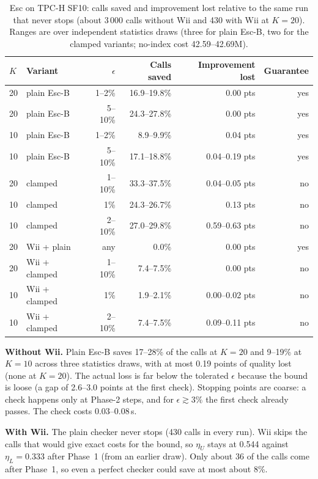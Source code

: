 \begin{table}[h]\centering\small
\begin{tabular}{llrrrr}\toprule
$K$ & Variant & $\epsilon$ & Calls saved & Improvement lost & Guarantee\\\midrule
20 & plain Esc-B & 1--2\% & 16.9--19.8\% & 0.00 pts & yes\\
20 & plain Esc-B & 5--10\% & 24.3--27.8\% & 0.00 pts & yes\\
10 & plain Esc-B & 1--2\% & 8.9--9.9\% & 0.04 pts & yes\\
10 & plain Esc-B & 5--10\% & 17.1--18.8\% & 0.04--0.19 pts & yes\\
20 & clamped & 1--10\% & 33.3--37.5\% & 0.04--0.05 pts & no\\
10 & clamped & 1\% & 24.3--26.7\% & 0.13 pts & no\\
10 & clamped & 2--10\% & 27.0--29.8\% & 0.59--0.63 pts & no\\
20 & Wii + plain & any & 0.0\% & 0.00 pts & yes\\
20 & Wii + clamped & 1--10\% & 7.4--7.5\% & 0.00 pts & no\\
10 & Wii + clamped & 1\% & 1.9--2.1\% & 0.00--0.02 pts & no\\
10 & Wii + clamped & 2--10\% & 7.4--7.5\% & 0.09--0.11 pts & no\\\bottomrule
\end{tabular}
\caption{Esc on TPC-H SF10: calls saved and improvement lost relative to the same run that never stops (about 3\,000 calls without Wii and 430 with Wii at $K=20$). Ranges are over independent statistics draws (three for plain Esc-B, two for the clamped variants; no-index cost 42.59--42.69M).}\label{tab:esc}
\end{table}

\textbf{Without Wii.} Plain Esc-B saves 17--28\% of the calls at $K=20$ and 9--19\% at $K=10$ across three statistics draws, with at most 0.19 points of quality lost (none at $K=20$). The actual loss is far below the tolerated $\epsilon$ because the bound is loose (a gap of 2.6--3.0 points at the first check). Stopping points are coarse: a check happens only at Phase-2 steps, and for $\epsilon\gtrsim3\%$ the first check already passes. The check costs 0.03--0.08\,s.

\textbf{With Wii.} The plain checker never stops (430 calls in every run). Wii skips the calls that would give exact costs for the bound, so $\eta_U$ stays at 0.544 against $\eta_L=0.333$ after Phase~1 (from an earlier draw). Only about 36 of the calls come after Phase~1, so even a perfect checker could save at most about 8\%.

